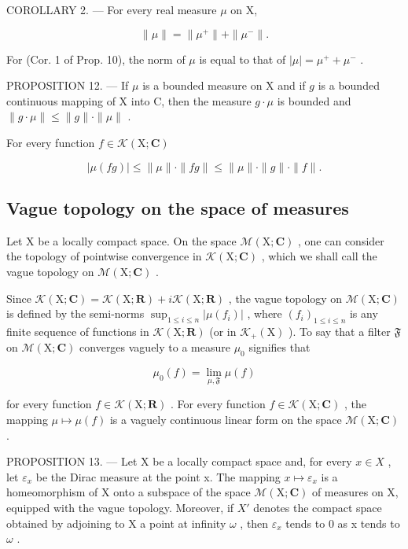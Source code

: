 COROLLARY 2. --- For every real measure \(\mu\) on X,

\[
\| \mu \| = \| \mu^ {+} \| + \| \mu^ {-} \|.
\]

For (Cor. 1 of Prop. 10), the norm of \(\mu\) is equal to that of \(|\mu| = \mu^{+} + \mu^{-}\) .

PROPOSITION 12. --- If \(\mu\) is a bounded measure on X and if \(g\) is a bounded continuous mapping of X into C, then the measure \(g \cdot \mu\) is bounded and \(\| g \cdot \mu \| \leqslant \| g \| \cdot \| \mu \|\) .

For every function \(f\in \mathcal{K}(\mathrm{X};\mathbf{C})\)

\[
| \mu (f g) | \leqslant \| \mu \| \cdot \| f g \| \leqslant \| \mu \| \cdot \| g \| \cdot \| f \|.
\]

\subsection{Vague topology on the space of measures}

Let X be a locally compact space. On the space \(\mathcal{M}(\mathrm{X};\mathbf{C})\) , one can consider the topology of pointwise convergence in \(\mathcal{K}(\mathrm{X};\mathbf{C})\) , which we shall call the vague topology on \(\mathcal{M}(\mathrm{X};\mathbf{C})\) .

Since \(\mathcal{K}(\mathrm{X};\mathbf{C}) = \mathcal{K}(\mathrm{X};\mathbf{R}) + i\mathcal{K}(\mathrm{X};\mathbf{R})\) , the vague topology on \(\mathcal{M}(\mathrm{X};\mathbf{C})\) is defined by the semi-norms \(\sup_{1\leqslant i\leqslant n}|\mu (f_i)|\) , where \((f_i)_{1\leqslant i\leqslant n}\) is any finite sequence of functions in \(\mathcal{K}(\mathrm{X};\mathbf{R})\) (or in \(\mathcal{K}_{+}(\mathrm{X})\) ). To say that a filter \(\mathfrak{F}\) on \(\mathcal{M}(\mathrm{X};\mathbf{C})\) converges vaguely to a measure \(\mu_0\) signifies that

\[
\mu_ {0} (f) = \lim _ {\mu , \mathfrak {F}} \mu (f)
\]

for every function \(f \in \mathcal{K}(\mathrm{X};\mathbf{R})\) . For every function \(f \in \mathcal{K}(\mathrm{X};\mathbf{C})\) , the mapping \(\mu \mapsto \mu(f)\) is a vaguely continuous linear form on the space \(\mathcal{M}(\mathrm{X};\mathbf{C})\) .

PROPOSITION 13. --- Let X be a locally compact space and, for every \(x \in X\) , let \(\varepsilon_{x}\) be the Dirac measure at the point x. The mapping \(x \mapsto \varepsilon_{x}\) is a homeomorphism of X onto a subspace of the space \(\mathcal{M}(\mathrm{X};\mathbf{C})\) of measures on X, equipped with the vague topology. Moreover, if \(X'\) denotes the compact space obtained by adjoining to X a point at infinity \(\omega\) , then \(\varepsilon_{x}\) tends to 0 as x tends to \(\omega\) .

